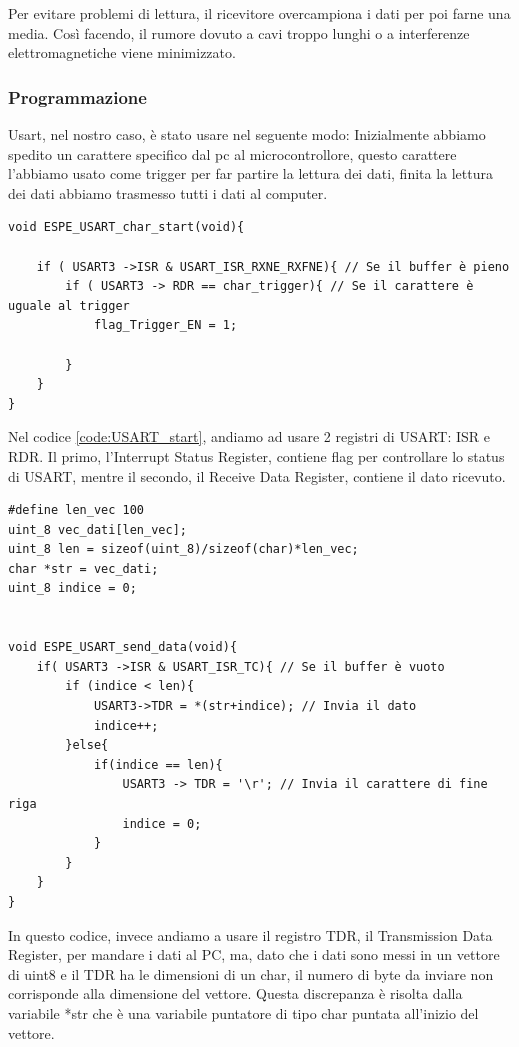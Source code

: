 Per evitare problemi di lettura, il ricevitore overcampiona i dati per poi farne una media. Così facendo, il rumore dovuto a cavi troppo lunghi o a interferenze elettromagnetiche viene minimizzato.\\


\subsubsection{Programmazione}
Usart, nel nostro caso, è stato usare nel seguente modo: Inizialmente abbiamo spedito un carattere specifico dal pc al microcontrollore, questo carattere l'abbiamo usato come trigger per far partire la lettura dei dati, finita la lettura dei dati abbiamo trasmesso tutti i dati al computer.\\

\noindent
\begin{verbatim}
void ESPE_USART_char_start(void){

    if ( USART3 ->ISR & USART_ISR_RXNE_RXFNE){ // Se il buffer è pieno
        if ( USART3 -> RDR == char_trigger){ // Se il carattere è uguale al trigger
            flag_Trigger_EN = 1;

        }
    }
}
\end{verbatim}
\label{code:USART_start}

Nel codice {\hypersetup{linkcolor=black}\ref{code:USART_start}}, andiamo ad usare 2 registri di USART: ISR e RDR. Il primo, l'Interrupt Status Register, contiene flag per controllare lo status di USART, mentre il secondo, il Receive Data Register, contiene il dato ricevuto.\\

\noindent
\begin{verbatim}
#define len_vec 100
uint_8 vec_dati[len_vec];
uint_8 len = sizeof(uint_8)/sizeof(char)*len_vec;
char *str = vec_dati;
uint_8 indice = 0;


void ESPE_USART_send_data(void){
    if( USART3 ->ISR & USART_ISR_TC){ // Se il buffer è vuoto
		if (indice < len){
			USART3->TDR = *(str+indice); // Invia il dato
			indice++;
		}else{
			if(indice == len){
				USART3 -> TDR = '\r'; // Invia il carattere di fine riga
				indice = 0;
			}
		}
	}
}
\end{verbatim}
\label{code:USART_send}

In questo codice, invece andiamo a usare il registro TDR, il Transmission Data Register, per mandare i dati al PC, ma, dato che i dati sono messi in un vettore di uint8 e il TDR ha le dimensioni di un char, il numero di byte da inviare non corrisponde alla dimensione del vettore. Questa discrepanza è risolta dalla variabile *str che è una variabile puntatore di tipo char puntata all'inizio del vettore.\\


